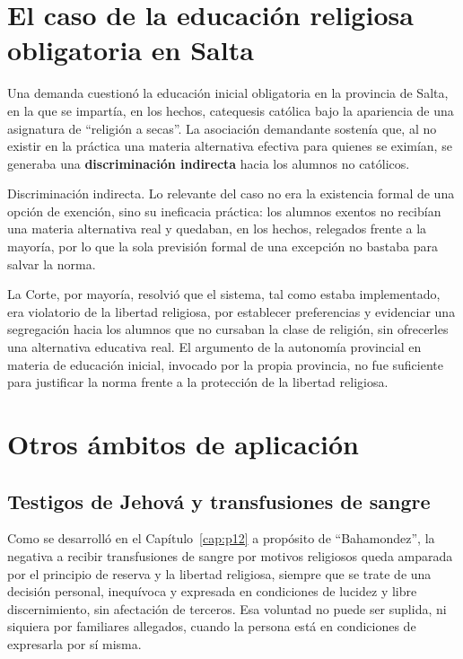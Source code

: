 \documentclass[12pt,oneside]{book}
\begin{document}
\section{El caso de la educación religiosa obligatoria en Salta}

Una demanda cuestionó la educación inicial obligatoria en la provincia de Salta,
en la que se impartía, en los hechos, catequesis católica bajo la apariencia de
una asignatura de ``religión a secas''. La asociación demandante sostenía que, al
no existir en la práctica una materia alternativa efectiva para quienes se
eximían, se generaba una \textbf{discriminación indirecta} hacia los alumnos no
católicos.

\begin{impbox}
Discriminación indirecta. Lo relevante del caso no era la existencia formal de
una opción de exención, sino su ineficacia práctica: los alumnos exentos no
recibían una materia alternativa real y quedaban, en los hechos, relegados frente
a la mayoría, por lo que la sola previsión formal de una excepción no bastaba para
salvar la norma.
\end{impbox}

La Corte, por mayoría, resolvió que el sistema, tal como estaba implementado, era
violatorio de la libertad religiosa, por establecer preferencias y evidenciar una
segregación hacia los alumnos que no cursaban la clase de religión, sin ofrecerles
una alternativa educativa real. El argumento de la autonomía provincial en materia
de educación inicial, invocado por la propia provincia, no fue suficiente para
justificar la norma frente a la protección de la libertad religiosa.

\section{Otros ámbitos de aplicación}

\subsection{Testigos de Jehová y transfusiones de sangre}

Como se desarrolló en el Capítulo~\ref{cap:p12} a propósito de ``Bahamondez'', la
negativa a recibir transfusiones de sangre por motivos religiosos queda amparada
por el principio de reserva y la libertad religiosa, siempre que se trate de una
decisión personal, inequívoca y expresada en condiciones de lucidez y libre
discernimiento, sin afectación de terceros. Esa voluntad no puede ser suplida, ni
siquiera por familiares allegados, cuando la persona está en condiciones de
expresarla por sí misma.
\end{document}
